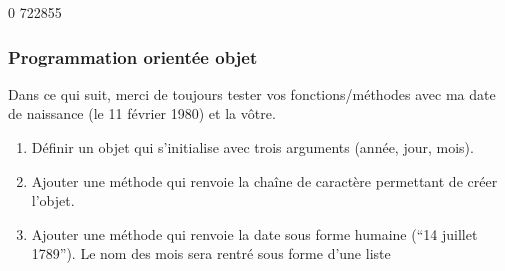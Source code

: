 \documentclass[letterpaper,10pt,english]{sphinxhowto}
\begin{document}
\begin{sphinxVerbatim}[commandchars=\\\{\}]
0
722855
\end{sphinxVerbatim}


\subsubsection{Programmation orientée objet}
\label{\detokenize{devoir_maison_Devoir Maison:programmation-orientee-objet}}
\sphinxAtStartPar
Dans ce qui suit, merci de toujours tester vos fonctions/méthodes avec ma date de naissance (le 11 février 1980) et la vôtre.
\begin{enumerate}
%
\setcounter{enumi}{4}
\item {} 
\sphinxAtStartPar
Définir un objet  qui s’initialise avec trois arguments (année, jour, mois).

\item {} 
\sphinxAtStartPar
Ajouter une méthode  qui renvoie la chaîne de caractère permettant de créer l’objet.

\item {} 
\sphinxAtStartPar
Ajouter une méthode  qui renvoie la date sous forme humaine (“14 juillet 1789”). Le nom des mois sera rentré sous forme d’une liste

\end{enumerate}

\begin{sphinxVerbatim}[commandchars=\\\{\}]
  \PYG{p}{[}
\PYG{p}{]}
\end{sphinxVerbatim}
\end{document}
